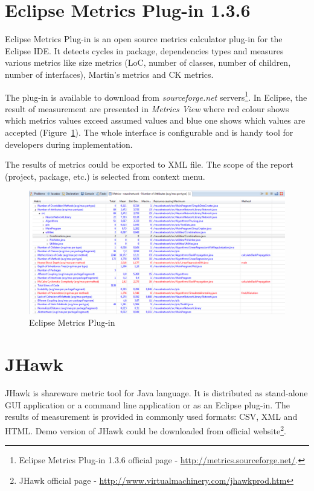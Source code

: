\section{Eclipse Metrics Plug-in 1.3.6}
Eclipse Metrics Plug-in is an open source metrics calculator plug-in for the Eclipse IDE. It detects
cycles in package, dependencies types and measures various metrics like size metrics (\ac{LoC}, number of classes, number of children, number of interfaces), Martin's metrics and \ac{CK metrics}. 

The plug-in is available to download from \textit{sourceforge.net} servers\footnote{Eclipse Metrics Plug-in 1.3.6 official page - \url{http://metrics.sourceforge.net/}.}. In Eclipse, the result of measurement are presented in \textit{Metrics View} where red colour shows which metrics values exceed assumed values and blue one shows which values are accepted (Figure~\ref{fig:eclipsemetrics}). The whole interface is configurable and is handy tool for developers during implementation. 

The results of metrics could be exported to XML file. The scope of the report (project, package, etc.) is selected from context menu.

\begin{figure}[h!]
	\centering
	\includegraphics[scale=0.45]{img/eclipse-plugin.png} 
	\caption{Eclipse Metrics Plug-in}		
	\label{fig:eclipsemetrics}
\end{figure}


\section{JHawk}
JHawk is shareware metric tool for Java language. It is distributed as stand-alone GUI application or a command line application or as an Eclipse plug-in. The results of measurement is provided in commonly used formats: CSV, XML and HTML. Demo version of JHawk could be downloaded from official website\footnote{JHawk official page - \url{http://www.virtualmachinery.com/jhawkprod.htm}}.

